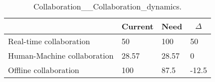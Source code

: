 
  \begin{table*}[]
  \centering
  \notsotiny
  \caption{ Collaboration__Collaboration_dynamics.}
\label{tab:collaboration__collaboration_dynamics}
\begin{tabular}{|l|l|l|l|}
  \hline
  \rowcolor[HTML]{C0C0C0}
    \multicolumn{1}{|c|}{Feature} & \multicolumn{1}{c|}{Current} & \multicolumn{1}{c|}{Need} & \multicolumn{1}{c|}{$\Delta$} \\ \hline
  Real-time collaboration & 50 & 100 & 50 \\ \hline 
Human-Machine collaboration & 28.57 & 28.57 & 0 \\ \hline 
Offline collaboration & 100 & 87.5 & -12.5 \\ \hline 
\end{tabular}%
  \end{table*}